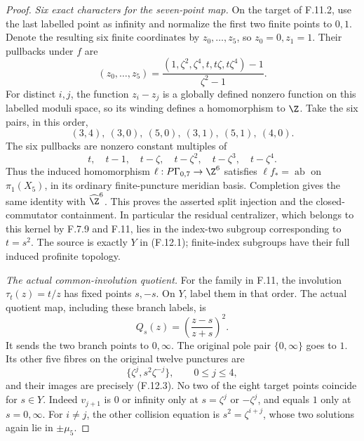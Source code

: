 \begin{proof}
\emph{Six exact characters for the seven-point map.}
On the target of F.11.2, use the last labelled
point as infinity and normalize the first two
finite points to $0,1$.  Denote the resulting
six finite coordinates by $z_0,\ldots,z_5$,
so $z_0=0,z_1=1$.  Their pullbacks under $f$ are
\[
 (z_0,\ldots,z_5)=
 \frac{(1,\zeta^2,\zeta^4,t,t\zeta,t\zeta^4)-1}
                         {\zeta^2-1}.
                                                               \tag{F.12.7}
\]
For distinct $i,j$, the function $z_i-z_j$
is a globally defined nonzero function on
this labelled moduli space, so its winding
defines a homomorphism to $\Z$.
Take the six pairs, in this order,
\[
            (3,4),\ (3,0),\ (5,0),\
                         (3,1),\ (5,1),\ (4,0).
                                                               \tag{F.12.8}
\]
The six pullbacks are nonzero constant multiples
of
\[
             t,\quad t-1,\quad t-\zeta,\quad
                       t-\zeta^2,\quad t-\zeta^3,\quad t-\zeta^4.
                                                               \tag{F.12.9}
\]
Thus the induced homomorphism
$\ell:P\Gamma_{0,7}\to\Z^6$ satisfies
$\ell f_*=\operatorname{ab}$ on
$\pi_1(X_5)$, in its ordinary finite-puncture
meridian basis.  Completion gives the same
identity with $\widehat\Z^6$.
This proves the asserted split injection and
the closed-commutator containment.
In particular the residual centralizer, which
belongs to this kernel by F.7.9 and F.11,
lies in the index-two subgroup corresponding
to $t=s^2$.
The source is exactly $Y$ in (F.12.1);
finite-index subgroups have their full
induced profinite topology.

\emph{The actual common-involution quotient.}
For the family in F.11, the involution
$\tau_t(z)=t/z$ has fixed points $s,-s$.
On $Y$, label them in that order.
The actual quotient map, including these
branch labels, is
\[
                  Q_s(z)=\left(\frac{z-s}{z+s}\right)^2 .
                                                               \tag{F.12.10}
\]
It sends the two branch points to $0,\infty$.
The original pole pair $\{0,\infty\}$ goes to
$1$.  Its other five fibres on the original
twelve punctures are
\[
    \{\zeta^j,s^2\zeta^{-j}\},\qquad 0\leq j\leq4,
\]
and their images are precisely (F.12.3).
No two of the eight target points coincide
for $s\in Y$.
Indeed $v_{j+1}$ is $0$ or infinity only at
$s=\zeta^j$ or $-\zeta^j$, and equals $1$
only at $s=0,\infty$.
For $i\ne j$, the other collision equation
is $s^2=\zeta^{i+j}$, whose two solutions
again lie in $\pm\mu_5$.


\end{proof}

